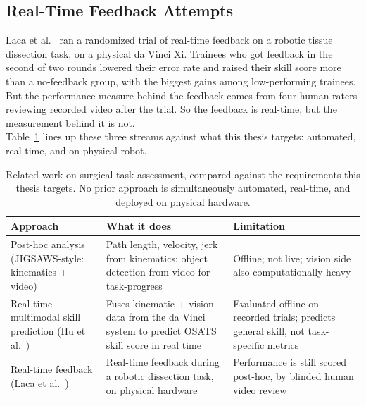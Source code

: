 \subsection{Real-Time Feedback Attempts}

Laca et al.~\cite{laca2022} ran a randomized trial of real-time feedback
on a robotic tissue dissection task, on a physical da Vinci Xi.
Trainees who got feedback in the second of two rounds lowered their
error rate and raised their skill score more than a no-feedback group,
with the biggest gains among low-performing trainees. But the performance 
measure behind the feedback comes from four human raters
reviewing recorded video after the trial. So the feedback is real-time,
but the measurement behind it is not. \\ 


Table~\ref{tab:related_work} lines up these three streams against what
this thesis targets: automated, real-time, and on physical robot.

\begin{table}[h]
\centering
\begin{tabular}{|p{3.2cm}|p{5.1cm}|p{4.3cm}|}
\hline
\textbf{Approach} & \textbf{What it does} & \textbf{Limitation} \\
\hline
Post-hoc analysis (JIGSAWS-style: kinematics + video) &
Path length, velocity, jerk from kinematics; object detection from
video for task-progress &
Offline; not live; vision side also computationally heavy \\[4pt]
\hline
Real-time multimodal skill prediction (Hu et al.~\cite{hu2026}) &
Fuses kinematic + vision data from the da Vinci system to predict OSATS
skill score in real time &
Evaluated offline on recorded trials; predicts general skill, not
task-specific metrics \\[4pt]
\hline
Real-time feedback (Laca et al.~\cite{laca2022}) &
Real-time feedback during a robotic dissection task, on physical
hardware &
Performance is still scored post-hoc, by blinded human video review \\[4pt]
\hline
\end{tabular}
\caption{Related work on surgical task assessment, compared against the
requirements this thesis targets. No prior approach is simultaneously
automated, real-time, and deployed on physical hardware.}
\label{tab:related_work}
\end{table}



